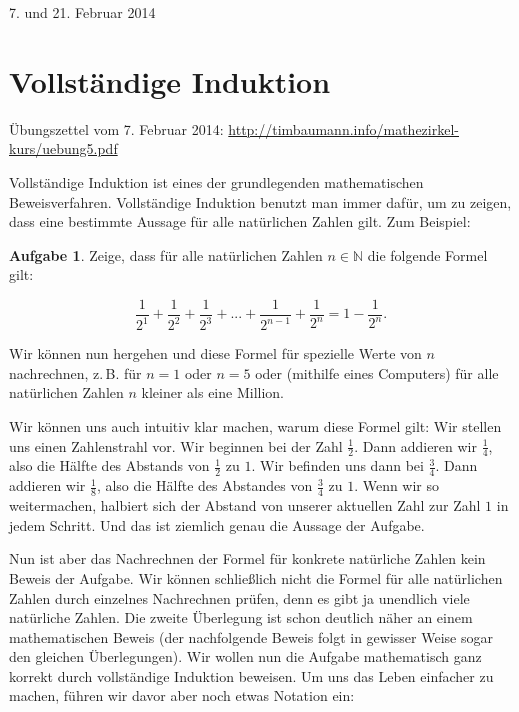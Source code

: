 \documentclass[a4paper,ngerman,12pt]{scrartcl}
\newcommand{\N}{\mathbb{N}}
\newcommand{\datum}[1]{\hfill {#1}\\}
\theoremstyle{definition}
\newtheorem*{aufg}{Aufgabe}
\begin{document}
\datum{7. und 21. Februar 2014}

\section{Vollständige Induktion}

Übungszettel vom 7. Februar 2014: \mbox{\url{http://timbaumann.info/mathezirkel-kurs/uebung5.pdf}}

Vollständige Induktion ist eines der grundlegenden mathematischen Beweisverfahren. Vollständige Induktion benutzt man immer dafür, um zu zeigen, dass eine bestimmte Aussage für alle natürlichen Zahlen gilt. Zum Beispiel:

\begin{aufg}
  Zeige, dass für alle natürlichen Zahlen $n \in \N$ die folgende Formel gilt:

  \[ \frac{1}{2^1} + \frac{1}{2^2} + \frac{1}{2^3} + ... + \frac{1}{2^{n-1}} + \frac{1}{2^n} = 1 - \frac{1}{2^n}. \]
\end{aufg}

Wir können nun hergehen und diese Formel für spezielle Werte von $n$ nachrechnen, z.\,B. für $n=1$ oder $n=5$ oder (mithilfe eines Computers) für alle natürlichen Zahlen $n$ kleiner als eine Million.

Wir können uns auch intuitiv klar machen, warum diese Formel gilt: Wir stellen uns einen Zahlenstrahl vor. Wir beginnen bei der Zahl $\frac{1}{2}$. Dann addieren wir $\frac{1}{4}$, also die Hälfte des Abstands von $\frac{1}{2}$ zu $1$. Wir befinden uns dann bei $\frac{3}{4}$. Dann addieren wir $\frac{1}{8}$, also die Hälfte des Abstandes von $\frac{3}{4}$ zu $1$. Wenn wir so weitermachen, halbiert sich der Abstand von unserer aktuellen Zahl zur Zahl $1$ in jedem Schritt. Und das ist ziemlich genau die Aussage der Aufgabe.

Nun ist aber das Nachrechnen der Formel für konkrete natürliche Zahlen kein Beweis der Aufgabe. Wir können schließlich nicht die Formel für alle natürlichen Zahlen durch einzelnes Nachrechnen prüfen, denn es gibt ja unendlich viele natürliche Zahlen. Die zweite Überlegung ist schon deutlich näher an einem mathematischen Beweis (der nachfolgende Beweis folgt in gewisser Weise sogar den gleichen Überlegungen). Wir wollen nun die Aufgabe mathematisch ganz korrekt durch vollständige Induktion beweisen. Um uns das Leben einfacher zu machen, führen wir davor aber noch etwas Notation ein:
\end{document}
